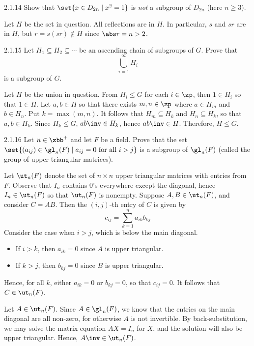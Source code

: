 \begin{exercise}{2.1.14}
    Show that $\set{ x \in D_{2n} \mid x^2 = 1 }$ is \emph{not} a subgroup of $D_{2n}$ (here $n \ge 3$).
\end{exercise}

\begin{sol}
    Let $H$ be the set in question.
	All reflections are in $H$.
	In particular, $s$ and $sr$ are in $H$, but $r = s(sr) \notin H$ since $\abs r = n > 2$.
\end{sol}

\begin{exercise}{2.1.15}
    Let $H_1 \subseteq H_2 \subseteq \cdots$ be an ascending chain of subgroups of $G$.
	Prove that
    \[
    	\bigcup_{i = 1}^\infty H_i
    \]
    is a subgroup of $G$.
\end{exercise}

\begin{sol}
    Let $H$ be the union in question.
	From $H_i \leq G$ for each $i \in \zp$, then $1 \in H_i$ so that $1 \in H$.
	Let $a, b \in H$ so that there exists $m, n \in \zp$ where $a \in H_m$ and $b \in H_n$.
	Put $k = \max(m, n)$.
	It follows that $H_m \subseteq H_k$ and $H_n \subseteq H_k$, so that $a, b \in H_k$.
	Since $H_k \leq G$, $ab\inv \in H_k$, hence $ab\inv \in H$.
	Therefore, $H \leq G$.
\end{sol}

\begin{exercise}{2.1.16}
    Let $n \in \zbb^+$ and let $F$ be a field.
	Prove that the set $\set{ (a_{ij}) \in \gl_n(F) \mid a_{ij} = 0 \text{ for all } i > j }$ is a subgroup of $\gl_n(F)$ (called the group of upper triangular matrices).
\end{exercise}

\begin{sol}
    Let $\ut_n(F)$ denote the set of $n \times n$ upper triangular matrices with entries from $F$.
	Observe that $I_n$ contains $0$'s everywhere except the diagonal, hence $I_n \in \ut_n(F)$ so that $\ut_n(F)$ is nonempty.
	Suppose $A, B \in \ut_n(F)$, and consider $C = AB$.
	Then the $(i, j)$-th entry of $C$ is given by
    \[
    	c_{ij} = \sum_{k = 1}^n a_{ik}b_{kj}
    \]
    Consider the case when $i > j$, which is below the main diagonal.
    \begin{itemize}
        \item If $i > k$, then $a_{ik} = 0$ since $A$ is upper triangular.
        \item If $k > j$, then $b_{kj} = 0$ since $B$ is upper triangular.
    \end{itemize}
    Hence, for all $k$, either $a_{ik} = 0$ or $b_{kj} = 0$, so that $c_{ij} = 0$.
	It follows that $C \in \ut_n(F)$.

    Let $A \in \ut_n(F)$.
	Since $A \in \gl_n(F)$, we know that the entries on the main diagonal are all non-zero, for otherwise $A$ is not invertible.
	By back-substitution, we may solve the matrix equation $AX = I_n$ for $X$, and the solution will also be upper triangular.
	Hence, $A\inv \in \ut_n(F)$.
\end{sol}

